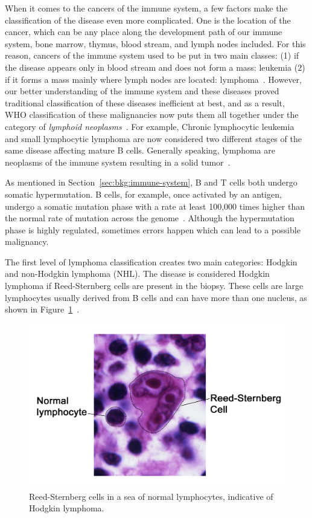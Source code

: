 When it comes to the cancers of the immune system, a few factors make the classification of the disease even more complicated. One is the location of the cancer, which can be any place along the development path of our immune system, bone marrow, thymus, blood stream, and lymph nodes included. For this reason, cancers of the immune system used to be put in two main classes: (1) if the disease appears only in blood stream and does not form a mass: leukemia (2) if it forms a mass mainly where lymph nodes are located: lymphoma~\cite{swerdlow20162016, younes2016handbook}. However, our better understanding of the immune system and these diseases proved traditional classification of these diseases inefficient at best, and as a result, WHO classification of these malignancies now puts them all together under the category of \emph{lymphoid neoplasms}~\cite{norris2008classification, swerdlow20162016}. For example, Chronic lymphocytic leukemia and small lymphocytic lymphoma are now considered two different stages of the same disease affecting mature B cells. Generally speaking, lymphoma are neoplasms of the immune system resulting in a solid tumor~\cite[Ch. 1]{younes2016handbook}.

As mentioned in Section~\ref{sec:bkg:immune-system}, B and T cells both undergo somatic hypermutation. B cells, for example, once activated by an antigen, undergo a somatic mutation phase with a rate at least 100,000 times higher than the normal rate of mutation across the genome~\cite{mendelsohn2014molecular}. Although the hypermutation phase is highly regulated, sometimes errors happen which can lead to a possible malignancy.

The first level of lymphoma classification creates two main categories: Hodgkin and non-Hodgkin lymphoma (NHL). The disease is considered Hodgkin lymphoma if Reed-Sternberg cells are present in the biopsy. These cells are large lymphocytes usually derived from B cells and can have more than one nucleus, as shown in Figure~\ref{fig:bkg:rs-cell}~\cite{sternberg1898eigenartige}.

\begin{figure}[!ht]
  \centering
  \includegraphics[width=.8\textwidth]{figs/background/Reed-Sternberg_lymphocyte_nci-vol-7172-300}
  \caption{Reed-Sternberg cells in a sea of normal lymphocytes, indicative of Hodgkin lymphoma.}
  \label{fig:bkg:rs-cell}
\end{figure}

